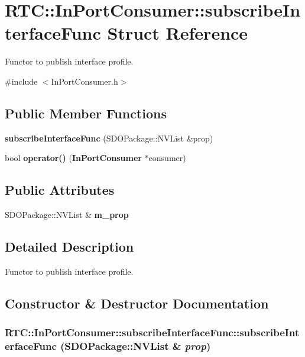 \section{RTC::InPortConsumer::subscribeInterfaceFunc Struct Reference}
\label{structRTC_1_1InPortConsumer_1_1subscribeInterfaceFunc}


Functor to publish interface profile.  




{\ttfamily \#include $<$InPortConsumer.h$>$}

\subsection*{Public Member Functions}
\begin{DoxyCompactItemize}
\item 
{\bf subscribeInterfaceFunc} (SDOPackage::NVList \&prop)
\item 
bool {\bf operator()} ({\bf InPortConsumer} $\ast$consumer)
\end{DoxyCompactItemize}
\subsection*{Public Attributes}
\begin{DoxyCompactItemize}
\item 
SDOPackage::NVList \& {\bf m\_\-prop}
\end{DoxyCompactItemize}


\subsection{Detailed Description}
Functor to publish interface profile. 

\subsection{Constructor \& Destructor Documentation}
\subsubsection[{subscribeInterfaceFunc}]{\setlength{\rightskip}{0pt plus 5cm}RTC::InPortConsumer::subscribeInterfaceFunc::subscribeInterfaceFunc (SDOPackage::NVList \& {\em prop})\hspace{0.3cm}{\ttfamily  [inline]}}\label{structRTC_1_1InPortConsumer_1_1subscribeInterfaceFunc_ab1bca317275a1d23844ce5bae9c23521}


